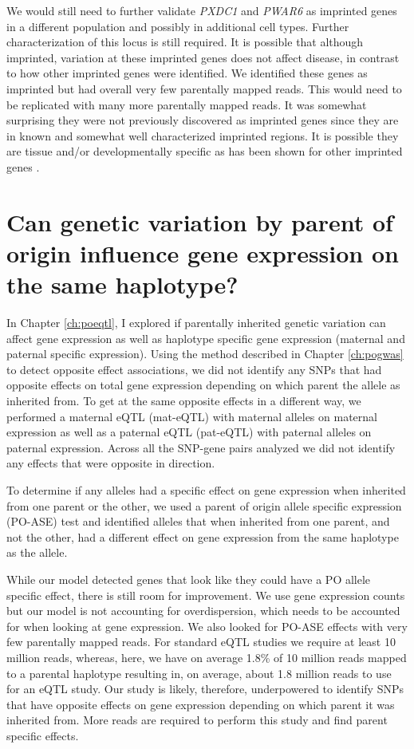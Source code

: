 We would still need to further validate \emph{PXDC1} and \emph{PWAR6} as imprinted genes in a different population and possibly in additional cell types. Further characterization of this locus is still required. It is possible that although imprinted, variation at these imprinted genes does not affect disease, in contrast to how other imprinted genes were identified. We identified these genes as imprinted but had overall very few parentally mapped reads. This would need to be replicated with many more parentally mapped reads. It was somewhat surprising they were not previously discovered as imprinted genes since they are in known and somewhat well characterized imprinted regions. It is possible they are tissue and/or developmentally specific as has been shown for other imprinted genes \cite{Baran:2015cx}. 

\section{Can genetic variation by parent of origin influence gene expression on the same haplotype?}

In Chapter \ref{ch:poeqtl}, I explored if parentally inherited genetic variation can affect gene expression as well as haplotype specific gene expression (maternal and paternal specific expression). Using the method described in Chapter \ref{ch:pogwas} to detect opposite effect associations, we did not identify any SNPs that had opposite effects on total gene expression depending on which parent the allele as inherited from. To get at the same opposite effects in a different way, we performed a maternal eQTL (mat-eQTL) with maternal alleles on maternal expression as well as a paternal eQTL (pat-eQTL) with paternal alleles on paternal expression. Across all the SNP-gene pairs analyzed we did not identify any effects that were opposite in direction. 

To determine if any alleles had a specific effect on gene expression when inherited from one parent or the other, we used a parent of origin allele specific expression (PO-ASE) test and identified alleles that when inherited from one parent, and not the other, had a different effect on gene expression from the same haplotype as the allele. 

While our model detected genes that look like they could have a PO allele specific effect, there is still room for improvement. We use gene expression counts but our model is not accounting for overdispersion, which needs to be accounted for when looking at gene expression. We also looked for PO-ASE effects with very few parentally mapped reads. For standard eQTL studies we require at least 10 million reads, whereas, here, we have on average 1.8\% of 10 million reads mapped to a parental haplotype resulting in, on average, about 1.8 million reads to use for an eQTL study. Our study is likely, therefore, underpowered to identify SNPs that have opposite effects on gene expression depending on which parent it was inherited from. More reads are required to perform this study and find parent specific effects. 
 
